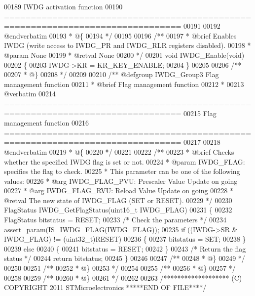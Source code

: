 \begin{DoxyCode}
00189 \textcolor{comment}{                          IWDG activation function}
00190 \textcolor{comment}{ ===============================================================================  }
00191 \textcolor{comment}{}
00192 \textcolor{comment}{@endverbatim}
00193 \textcolor{comment}{  * @\{}
00194 \textcolor{comment}{  */}
00195 
00196 \textcolor{comment}{/**}
00197 \textcolor{comment}{  * @brief  Enables IWDG (write access to IWDG\_PR and IWDG\_RLR registers disabled).}
00198 \textcolor{comment}{  * @param  None}
00199 \textcolor{comment}{  * @retval None}
00200 \textcolor{comment}{  */}
00201 \textcolor{keywordtype}{void} IWDG_Enable(\textcolor{keywordtype}{void})
00202 \{
00203   IWDG->KR = KR_KEY_ENABLE;
00204 \}
00205 
00206 \textcolor{comment}{/**}
00207 \textcolor{comment}{  * @\}}
00208 \textcolor{comment}{  */}
00209 
00210 \textcolor{comment}{/** @defgroup IWDG\_Group3 Flag management function }
00211 \textcolor{comment}{ *  @brief  Flag management function  }
00212 \textcolor{comment}{ *}
00213 \textcolor{comment}{@verbatim   }
00214 \textcolor{comment}{ ===============================================================================}
00215 \textcolor{comment}{                            Flag management function }
00216 \textcolor{comment}{ ===============================================================================  }
00217 \textcolor{comment}{}
00218 \textcolor{comment}{@endverbatim}
00219 \textcolor{comment}{  * @\{}
00220 \textcolor{comment}{  */}
00221 
00222 \textcolor{comment}{/**}
00223 \textcolor{comment}{  * @brief  Checks whether the specified IWDG flag is set or not.}
00224 \textcolor{comment}{  * @param  IWDG\_FLAG: specifies the flag to check.}
00225 \textcolor{comment}{  *          This parameter can be one of the following values:}
00226 \textcolor{comment}{  *            @arg IWDG\_FLAG\_PVU: Prescaler Value Update on going}
00227 \textcolor{comment}{  *            @arg IWDG\_FLAG\_RVU: Reload Value Update on going}
00228 \textcolor{comment}{  * @retval The new state of IWDG\_FLAG (SET or RESET).}
00229 \textcolor{comment}{  */}
00230 FlagStatus IWDG_GetFlagStatus(uint16\_t IWDG\_FLAG)
00231 \{
00232   FlagStatus bitstatus = RESET;
00233   \textcolor{comment}{/* Check the parameters */}
00234   assert_param(IS\_IWDG\_FLAG(IWDG\_FLAG));
00235   \textcolor{keywordflow}{if} ((IWDG->SR & IWDG\_FLAG) != (uint32\_t)RESET)
00236   \{
00237     bitstatus = SET;
00238   \}
00239   \textcolor{keywordflow}{else}
00240   \{
00241     bitstatus = RESET;
00242   \}
00243   \textcolor{comment}{/* Return the flag status */}
00244   \textcolor{keywordflow}{return} bitstatus;
00245 \}
00246 
00247 \textcolor{comment}{/**}
00248 \textcolor{comment}{  * @\}}
00249 \textcolor{comment}{  */}
00250 
00251 \textcolor{comment}{/**}
00252 \textcolor{comment}{  * @\}}
00253 \textcolor{comment}{  */}
00254 
00255 \textcolor{comment}{/**}
00256 \textcolor{comment}{  * @\}}
00257 \textcolor{comment}{  */}
00258 
00259 \textcolor{comment}{/**}
00260 \textcolor{comment}{  * @\}}
00261 \textcolor{comment}{  */}
00262 
00263 \textcolor{comment}{/******************* (C) COPYRIGHT 2011 STMicroelectronics *****END OF FILE****/}
\end{DoxyCode}
